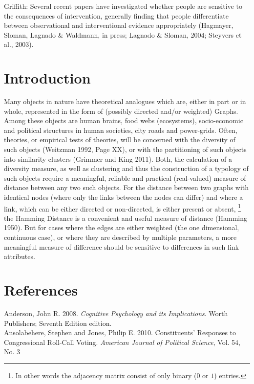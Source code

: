 \documentclass[12pt]{article}
\begin{document}
Griffith:
Several recent papers have investigated whether people are sensitive to the consequences of intervention, generally finding that people differentiate between observational and interventional evidence appropriately (Hagmayer, Sloman, Lagnado \& Waldmann, in press; Lagnado \& Sloman, 2004; Steyvers et al., 2003).   
    
\section{Introduction}
Many objects in nature have theoretical analogues which are, either in part or in whole, represented in the form of (possibly directed and/or weighted) Graphs. Among these objects are human brains, food webs (ecosystems), socio-economic and political structures in human societies, city roads and power-grids. Often, theories, or empirical tests of theories, will be concerned with the diversity of such objects (Weitzman 1992, Page XX), or with the partitioning of such objects into similarity clusters (Grimmer and King 2011). Both, the calculation of a diversity measure, as well as clustering and thus the construction of a typology of such objects require a meaningful, reliable and practical (real-valued) measure of distance between any two such objects. For the distance between two graphs with identical nodes (where only the links between the nodes can differ) and where a link, which can be either directed or non-directed, is either present or absent, \footnote{In other words the adjacency matrix consist of only binary ($0$ or $1$) entries.} the Hamming Distance is a convenient and useful measure of distance (Hamming 1950). But for cases where the edges are either weighted (the one dimensional, continuous case), or where they are described by multiple parameters, a more meaningful measure of difference should be sensitive to differences in such link attributes.          

\section{References}

Anderson, John R. 2008. \textit{Cognitive Psychology and its Implications}. Worth Publishers; Seventh Edition edition.
\\

Ansolabehere, Stephen and Jones, Philip E. 2010. Constituents' Responses to Congressional Roll-Call Voting. \textit{American Journal of Political Science}, Vol. 54, No. 3
\\
\end{document}

